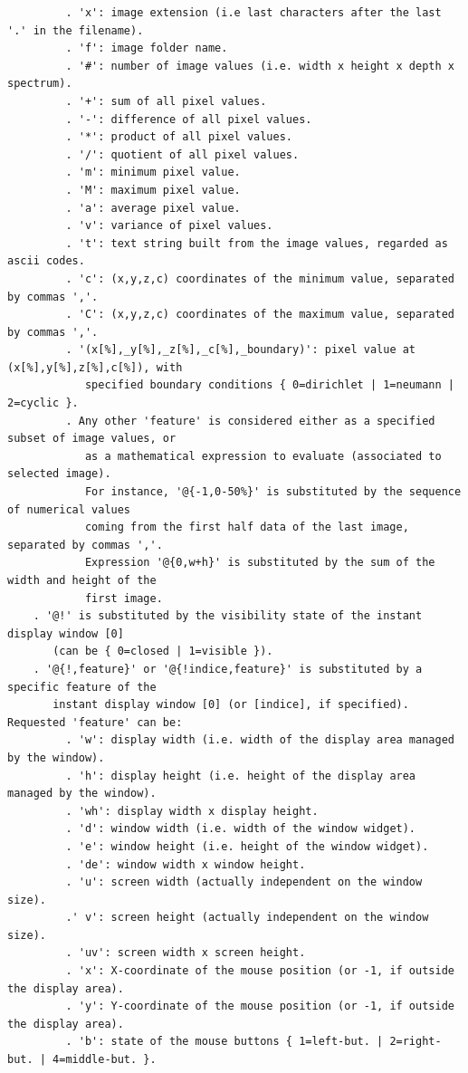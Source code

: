 \documentclass[a4paper,11pt,twoside]{book}
\begin{document}
\begin{lstlisting}
         . 'x': image extension (i.e last characters after the last '.' in the filename). 
         . 'f': image folder name. 
         . '#': number of image values (i.e. width x height x depth x spectrum). 
         . '+': sum of all pixel values. 
         . '-': difference of all pixel values. 
         . '*': product of all pixel values. 
         . '/': quotient of all pixel values. 
         . 'm': minimum pixel value. 
         . 'M': maximum pixel value. 
         . 'a': average pixel value. 
         . 'v': variance of pixel values. 
         . 't': text string built from the image values, regarded as ascii codes. 
         . 'c': (x,y,z,c) coordinates of the minimum value, separated by commas ','. 
         . 'C': (x,y,z,c) coordinates of the maximum value, separated by commas ','. 
         . '(x[%],_y[%],_z[%],_c[%],_boundary)': pixel value at (x[%],y[%],z[%],c[%]), with 
            specified boundary conditions { 0=dirichlet | 1=neumann | 2=cyclic }. 
         . Any other 'feature' is considered either as a specified subset of image values, or 
            as a mathematical expression to evaluate (associated to selected image). 
            For instance, '@{-1,0-50%}' is substituted by the sequence of numerical values 
            coming from the first half data of the last image, separated by commas ','. 
            Expression '@{0,w+h}' is substituted by the sum of the width and height of the 
            first image. 
    . '@!' is substituted by the visibility state of the instant display window [0] 
       (can be { 0=closed | 1=visible }). 
    . '@{!,feature}' or '@{!indice,feature}' is substituted by a specific feature of the 
       instant display window [0] (or [indice], if specified). Requested 'feature' can be: 
         . 'w': display width (i.e. width of the display area managed by the window). 
         . 'h': display height (i.e. height of the display area managed by the window). 
         . 'wh': display width x display height. 
         . 'd': window width (i.e. width of the window widget). 
         . 'e': window height (i.e. height of the window widget). 
         . 'de': window width x window height. 
         . 'u': screen width (actually independent on the window size). 
         .' v': screen height (actually independent on the window size). 
         . 'uv': screen width x screen height. 
         . 'x': X-coordinate of the mouse position (or -1, if outside the display area). 
         . 'y': Y-coordinate of the mouse position (or -1, if outside the display area). 
         . 'b': state of the mouse buttons { 1=left-but. | 2=right-but. | 4=middle-but. }. 

\end{lstlisting}
\end{document}
